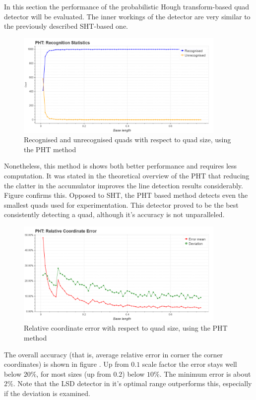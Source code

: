 In this section the performance of the probabilistic Hough transform-based quad detector will be evaluated.
The inner workings of the detector are very similar to the previously described SHT-based one.
\begin{figure}[ht]
	\centering
	\includegraphics[width=0.9\textwidth]{figures/plots/pht_rec_unrec_count.png}
	\caption{Recognised and unrecognised quads with respect to quad size, using the PHT method}
	\label{fig:phtRecCnt}
\end{figure}
Nonetheless, this method is shows both better performance and requires less computation.
It was stated in the theoretical overview of the PHT that reducing the clatter in the accumulator improves the line detection results considerably.
Figure  confirms this.
Opposed to SHT, the PHT based method detects even the smallest quads used for experimentation.
This detector proved to be the best consistently detecting a quad, although it's accuracy is not unparalleled.

\begin{figure}[ht]
	\centering
	\includegraphics[width=0.9\textwidth]{figures/plots/pht_relative_coordinate_error.png}
	\caption{Relative coordinate error with respect to quad size, using the PHT method}
	\label{fig:phtRelCoordErr}
\end{figure}
The overall accuracy (that is, average relative error in corner the corner coordinates) is shown in figure .
Up from $0.1$ scale factor the error stays well below $20\%$, for most sizes (up from $0.2$) below $10\%$.
The minimum error is about $2\%$.
Note that the LSD detector in it's optimal range outperforms this, especially if the deviation is examined.

